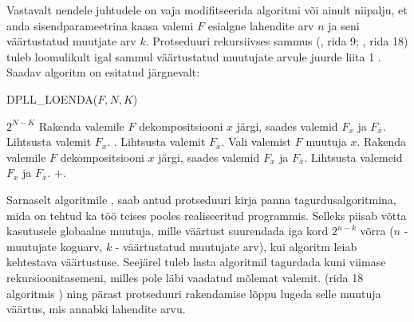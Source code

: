 Vastavalt nendele juhtudele on vaja modifitseerida algoritmi  või
 ainult niipalju, et anda sisendparameetrina kaasa valemi $F$
esialgne lahendite arv $n$ ja seni väärtustatud muutjate arv $k$. Protseduuri
rekursiivses sammus (, rida 9; , rida 18) tuleb
loomulikult igal sammul väärtustatud muutujate arvule juurde liita 1 . Saadav
algoritm on esitatud järgnevalt:

\begin{algorithm}{DPLL\_LOENDA($F,N,K$)}
\abody

\begin{algorithmic}[1]
	\RETURN $2^{N-K}$
	\STATE Rakenda valemile $F$ dekompositsiooni $x$ järgi, saades valemid
	$F_x$ ja $F_{\bar{x}}$.
		\STATE Lihtsusta valemit $F_x$.
		\RETURN {}.
	\ELSE
		\STATE Lihtsusta valemit $F_{\bar{x}}$.
		\RETURN {}
	\ENDIF
\ELSE
	\STATE Vali valemist $F$ muutuja $x$.
	\STATE Rakenda valemile $F$ dekompositsiooni $x$ järgi, saades valemid $F_x$
	ja $F_{\bar{x}}$.
	\STATE Lihtsusta valemeid $F_x$ ja $F_{\bar{x}}$.
	\RETURN {}$ + $.
\ENDIF
\end{algorithmic}
\end{algorithm}

Sarnaselt algoritmile , saab antud protseduuri kirja panna
tagurdusalgoritmina, mida on tehtud ka töö teises pooles realiseeritud
programmis. Selleks piisab võtta kasutusele globaalne muutuja, mille
väärtust suurendada iga kord $2^{n-k}$ võrra ($n$ - muutujate koguarv, $k$ -
väärtustatud muutujate arv), kui algoritm leiab kehtestava väärtustuse.
Seejärel tuleb lasta algoritmil tagurdada kuni viimase rekursioonitasemeni,
milles pole läbi vaadatud mõlemat valemit. (rida 18 algoritmis
) ning pärast protseduuri rakendamise lõppu lugeda selle
muutuja väärtus, mis annabki lahendite arvu.

